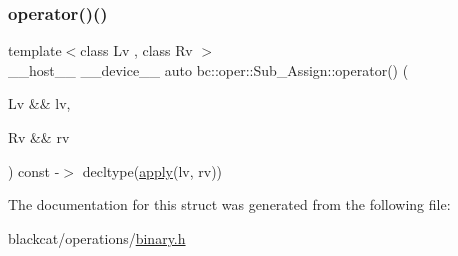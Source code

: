 \mbox{\label{structbc_1_1oper_1_1Sub__Assign_a46d7761920a5b9850e4e04278f1d833c}} 
\subsubsection{\texorpdfstring{operator()()}{operator()()}}
{\footnotesize\ttfamily template$<$class Lv , class Rv $>$ \\
\+\_\+\+\_\+host\+\_\+\+\_\+ \+\_\+\+\_\+device\+\_\+\+\_\+ auto bc\+::oper\+::\+Sub\+\_\+\+Assign\+::operator() (\begin{DoxyParamCaption}\item[{Lv \&\&}]{lv,  }\item[{Rv \&\&}]{rv }\end{DoxyParamCaption}) const -\/$>$ decltype(\hyperlink{structbc_1_1oper_1_1Sub__Assign_ab2173e9d8672bce4eb744d57092c6f1c}{apply}(lv, rv)) \hspace{0.3cm}{\ttfamily [inline]}}



The documentation for this struct was generated from the following file\+:\begin{DoxyCompactItemize}
\item 
blackcat/operations/\hyperlink{binary_8h}{binary.\+h}\end{DoxyCompactItemize}
